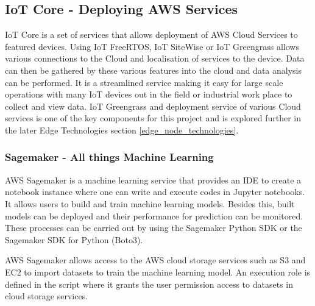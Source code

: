 \subsection{IoT Core - Deploying AWS Services}
IoT Core is a set of services that allows deployment of AWS Cloud Services to featured devices. Using IoT FreeRTOS, IoT SiteWise or IoT Greengrass allows various connections to the Cloud and localisation of services to the device. Data can then be gathered by these various features into the cloud and data analysis can be performed. It is a streamlined service making it easy for large scale operations with many IoT devices out in the field or industrial work place to collect and view data. IoT Greengrass and deployment service of various Cloud services is one of the key components for this project and is explored further in the later Edge Technologies section \ref{edge_node_technologies}.



\subsubsection{Sagemaker - All things Machine Learning} 
AWS Sagemaker is a machine learning service that provides an IDE to create  a notebook instance where one can write and execute codes in Jupyter notebooks. It allows users to build and train machine learning models. Besides this, built models can be deployed and their performance for prediction can be monitored. These processes can be carried out by using the Sagemaker Python SDK or the Sagemaker SDK for Python (Boto3).

AWS Sagemaker allows access to the AWS cloud storage services such as S3 and EC2 to import datasets to train the machine learning model. An execution role is defined in the script where it grants the user permission access to datasets in cloud storage services.

